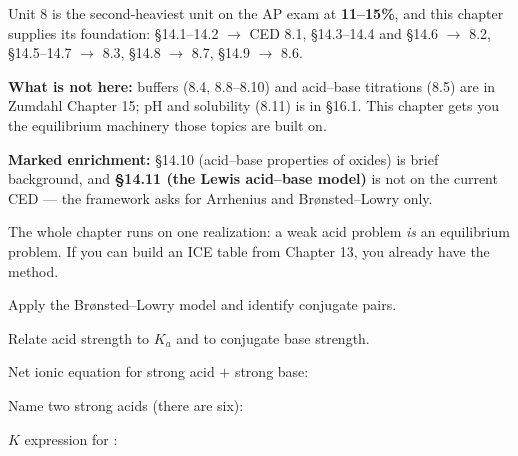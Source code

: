 \documentclass{apchem-notes}
\begin{document}
\apctitleblock

\begin{apcnote}
Unit 8 is the second-heaviest unit on the AP exam at \textbf{11--15\%}, and
this chapter supplies its foundation: \S14.1--14.2 $\to$ CED 8.1,
\S14.3--14.4 and \S14.6 $\to$ 8.2, \S14.5--14.7 $\to$ 8.3,
\S14.8 $\to$ 8.7, \S14.9 $\to$ 8.6.

\textbf{What is not here:} buffers (8.4, 8.8--8.10) and acid--base titrations
(8.5) are in Zumdahl Chapter 15; pH and solubility (8.11) is in \S16.1.
This chapter gets you the equilibrium machinery those topics are built on.

\textbf{Marked enrichment:} \S14.10 (acid--base properties of oxides) is
brief background, and \textbf{\S14.11 (the Lewis acid--base model)} is not on
the current CED --- the framework asks for Arrhenius and Br\o nsted--Lowry
only.

The whole chapter runs on one realization: a weak acid problem
\emph{is} an equilibrium problem. If you can build an ICE table from
Chapter 13, you already have the method.
\end{apcnote}


\begin{objectives}
  \item Apply the Br\o nsted--Lowry model and identify conjugate pairs.
  \item Relate acid strength to $K_a$ and to conjugate base strength.
\end{objectives}


\begin{warmup}[3]
  \item Net ionic equation for strong acid $+$ strong base:
  \item Name two strong acids (there are six):
  \item $K$ expression for :
        \answerblank[4.2cm]{$[\ce{H+}][\ce{A^-}]/[\ce{HA}]$}
\end{warmup}


\end{document}
